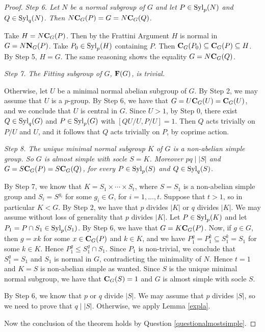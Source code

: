 \documentclass[12pt,leqno,a4paper]{amsart}
\def\syl#1#2{{\rm Syl}_#1(#2)}
\def\norm#1#2{{\bf N}_{#1}(#2)}
\def\cent#1#2{{\bf C}_{#1}(#2)}
\def\sbs{\subseteq}
\theoremstyle{remark}
\begin{document}
\begin{proof}
\medskip

\textit{Step 6. Let $N$ be a normal subgroup of $G$ and let $P\in{\rm Syl}_p(N)$ and $Q\in{\rm Syl}_q(N)$. Then $N\cent G P=G=N\cent G Q$. }
\smallskip

Take $H=N\cent G P$. Then by the Frattini Argument $H$ is normal in $G=N\norm G P$. Take $P_0\in{\rm Syl}_p(H)$ containing $P$. Then $\cent G {P_0}\subseteq\cent G P\subseteq H$. By Step 5, $H=G$. The same reasoning shows the equality $G=N\cent G Q$. 

\medskip

\textit{Step 7. The Fitting subgroup of $G$, ${\rm\textbf{F}}(G)$, is trivial. }
\smallskip

Otherwise,
let $U$ be a minimal normal abelian subgroup of $G$. By Step 2, we may assume that $U$ is
a $p$-group. By Step 6,
we have that $G=U\cent GU=\cent GU$, and we conclude that $U$
is central in $G$.   Since $U>1$, by Step 0,
there exist $Q\in{\rm Syl}_q(G)$ and $P\in{\rm Syl}_p(G)$ with $[QU/U,P/U]=1$. Then $Q$ acts trivially on $P/U$ and $U$,
and it follows that $Q$ acts trivially on $P$, by coprime action. 

\medskip


\textit{Step 8. The unique minimal normal subgroup $K$ of $G$
is a non-abelian simple group. So $G$ is almost simple with socle $S=K$. Moreover $pq\mid |S|$ and $G=S\cent G P=S\cent G Q$, for every $P\in{\rm Syl}_p(S)$ and $Q\in{\rm Syl}_q(S)$.}

By Step 7,  we know that $K=S_1\times\cdots\times S_t$, where $S=S_1$ is a non-abelian simple group and $S_i=S^{g_i}$ for some $g_i\in G$, for $i=1,\ldots,t$. Suppose that $t>1$, so in particular $K<G$. By Step 2,
 we have that $p$ divides $|K|$ or $q$ divides $|K|$. We may assume without loss of generality that $p$ divides $|K|$. Let
  $P\in{\rm Syl}_p(K)$ and let $P_1=P\cap S_1
  \in \syl p{S_1}$. By Step 6, we have that $G=K\cent G P$. Now, if  $g\in G$,
  then $g=xk$ for some $x\in \cent GP$ and $k\in K$, and we have $P_1^g=P_1^k \sbs S_1^k=S_1$ for some $k\in K$.
  Hence $P_1^g\leq S_1^g\cap S_1$. Since $P_1$ is non-trivial,
   we conclude that $S_1^g= S_1$ and $S_1$ is normal in $G$, contradicting the minimality of $N$. Hence $t=1$ and $K=S$ is non-abelian simple as wanted. Since $S$ is the unique minimal normal subgroup,
   we have that  $\cent G S=1$ and $G$ is almost simple with socle $S$.

 By Step 6,  we know that $p$ or $q$ divide $|S|$. We may assume that $p$ divides $|S|$, so we need to prove that $q\mid |S|$.
 Otherwise, we apply Lemma \ref{expla}.

Now the conclusion of the theorem holds by Question \ref{questionalmostsimple}.
\end{proof}
\end{document}
